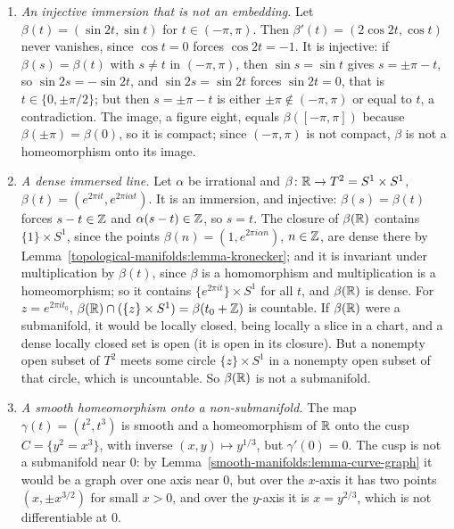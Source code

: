 \begin{counterexample}\label{smooth-manifolds:counterexample-immersions}
\begin{enumerate}
\item \emph{An injective immersion that is not an embedding.} Let $\beta(t) = (\sin 2t, \sin t)$ for $t \in (-\pi, \pi)$. Then $\beta'(t) = (2\cos 2t, \cos t)$ never vanishes, since $\cos t = 0$ forces $\cos 2t = -1$. It is injective: if
$\beta(s) = \beta(t)$ with $s \neq t$ in $(-\pi, \pi)$, then $\sin s = \sin t$ gives $s = \pm\pi - t$, so $\sin 2s = -\sin 2t$, and $\sin 2s = \sin 2t$ forces $\sin 2t = 0$, that is $t \in \{0, \pm\pi/2\}$; but then $s = \pm\pi - t$
is either $\pm\pi \notin (-\pi, \pi)$ or equal to $t$, a contradiction. The image, a figure
eight, equals $\beta([-\pi, \pi])$ because $\beta(\pm\pi) = \beta(0)$, so it is compact; since $(-\pi, \pi)$ is not compact, $\beta$ is not a homeomorphism onto its image.
\item \emph{A dense immersed line.} Let $\alpha$ be irrational and $\beta \colon \mathbb{R} \to T^2 = S^1 \times S^1$, $\beta(t) = (e^{2\pi it}, e^{2\pi i\alpha t})$. It is an immersion, and injective: $\beta(s) = \beta(t)$ forces $s - t \in \mathbb{Z}$ and
$\alpha(s - t) \in \mathbb{Z}$, so $s = t$. The closure of $\beta(\mathbb{R})$ contains $\{1\} \times S^1$, since the points $\beta(n) = (1, e^{2\pi i\alpha n})$, $n \in \mathbb{Z}$, are dense there by Lemma~\ref{topological-manifolds:lemma-kronecker}; and it is
invariant under multiplication by $\beta(t)$, since $\beta$ is a homomorphism and multiplication is a homeomorphism; so it contains $\{e^{2\pi it}\} \times S^1$ for all $t$, and $\beta(\mathbb{R})$ is dense. For $z = e^{2\pi it_0}$,
$\beta(\mathbb{R}) \cap (\{z\} \times S^1) = \beta(t_0 + \mathbb{Z})$ is countable. If $\beta(\mathbb{R})$ were a submanifold, it would be locally closed, being locally a slice in a chart, and a dense locally closed set is open (it is open in its
closure). But a nonempty open subset of $T^2$ meets some circle $\{z\} \times S^1$ in a nonempty open subset of that circle, which is uncountable. So $\beta(\mathbb{R})$ is not a submanifold.
\item \emph{A smooth homeomorphism onto a non-submanifold.} The map $\gamma(t) = (t^2, t^3)$ is smooth and a homeomorphism of $\mathbb{R}$ onto the cusp $C = \{y^2 = x^3\}$, with inverse $(x, y) \mapsto y^{1/3}$, but $\gamma'(0) = 0$. The cusp is
not a submanifold near $0$: by Lemma~\ref{smooth-manifolds:lemma-curve-graph} it would be a graph over one axis near $0$, but over the $x$-axis it has two points $(x, \pm x^{3/2})$ for small $x > 0$, and over the $y$-axis it is
$x = y^{2/3}$, which is not differentiable at $0$.
\end{enumerate}
\end{counterexample}

